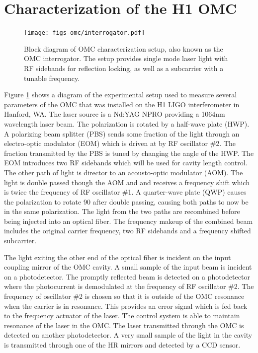 \section{Characterization of the H1 OMC}
\begin{figure}
  \begin{center}
  \leavevmode
  \texttt{[image: figs-omc/interrogator.pdf]}
  \end{center}
  \caption[Block diagram of OMC characterization setup.]{Block diagram of OMC characterization setup, also known as the OMC interrogator. The setup provides single mode laser light with RF sidebands for reflection locking, as well as a subcarrier with a tunable frequency.}
  \label{fig:interrogator}
\end{figure}

Figure \ref{fig:interrogator} shows a diagram of the experimental setup used to measure several parameters of the OMC that was installed on the H1 LIGO interferometer in Hanford, WA. %
The laser source is a Nd:YAG NPRO providing a 1064nm wavelength laser beam. %
The polarization is rotated by a half-wave plate (HWP). %
A polarizing beam splitter (PBS) sends some fraction of the light through an electro-optic modulator (EOM) which is driven at by RF oscillator \#2. %
The fraction transmitted by the PBS is tuned by changing the angle of the HWP. %
The EOM introduces two RF sidebands which will be used for cavity length control. %
The other path of light is director to an acousto-optic modulator (AOM). %
The light is double passed though the AOM and and receives a frequency shift which is twice the frequency of RF oscillator \#1. %
A quarter-wave plate (QWP) causes the polarization to rotate 90\degrees{} after double passing, causing both paths to now be in the same polarization. %
The light from the two paths are recombined before being injected into an optical fiber. %
The frequency makeup of the combined beam includes the original carrier frequency, two RF sidebands and a frequency shifted subcarrier.

The light exiting the other end of the optical fiber is incident on the input coupling mirror of the OMC cavity. %
A small sample of the input beam is incident on a photodetector. %
The promptly reflected beam is detected on a photodetector where the photocurrent is demodulated at the frequency of RF oscillator \#2. %
The frequency of oscillator \#2 is chosen so that it is outside of the OMC resonance when the carrier is in resonance. %
This provides an error signal which is fed back to the frequency actuator of the laser. %
The control system is able to maintain resonance of the laser in the OMC. %
The laser transmitted through the OMC is detected on another photodetector. %
A very small sample of the light in the cavity is transmitted through one of the HR mirrors and detected by a CCD sensor.

